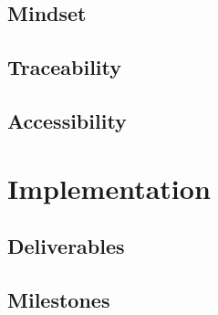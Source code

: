 \documentclass[conference]{IEEEtran} %
\begin{document}

\subsection{Mindset}
\label{subsec:mindset}


\subsection{Traceability}
\label{subsec:traceability}


\subsection{Accessibility}
\label{subsec:plug-n-play}



\section{Implementation}
\label{sec:implementation}



\subsection{Deliverables}
\label{subsec:deliverables}


\subsection{Milestones}
\label{subsec:milestones}
\end{document}
